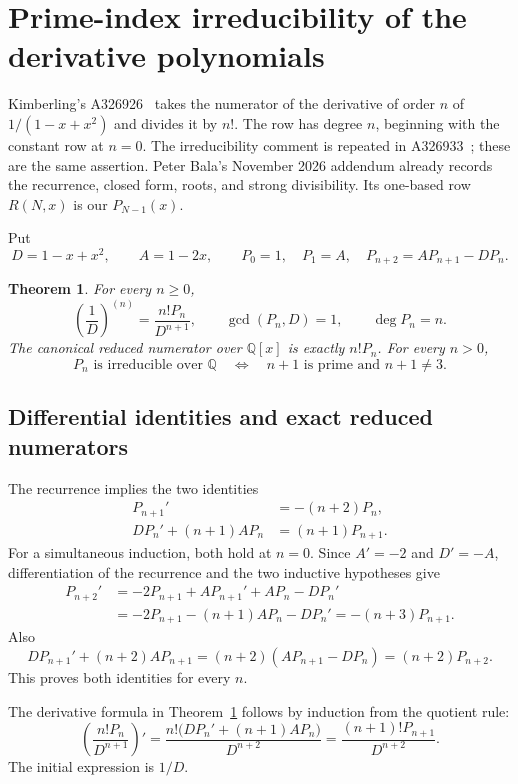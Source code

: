 \documentclass[11pt]{article}
\newtheorem{theorem}{Theorem}[section]
\newcommand{\Q}{\mathbb Q}
\begin{document}
\section{Prime-index irreducibility of the derivative polynomials}
\label{sec:polynomials}

Kimberling's A326926~\cite{A326926} takes the numerator of the
derivative of order $n$ of $1/(1-x+x^2)$ and divides it by $n!$.
The row has degree $n$, beginning with the constant row at $n=0$.
The irreducibility comment is repeated in A326933~\cite{A326933};
these are the same assertion. Peter Bala's November 2026 addendum
already records the recurrence, closed form, roots, and strong
divisibility. Its one-based row $R(N,x)$ is our $P_{N-1}(x)$.

Put
\[
D=1-x+x^2,\qquad A=1-2x,\qquad
P_0=1,\quad P_1=A,\quad P_{n+2}=AP_{n+1}-DP_n.
\]

\begin{theorem}\label{thm:polynomials}
For every $n\ge0$,
\[
\left(\frac1D\right)^{(n)}=\frac{n!P_n}{D^{n+1}},
\qquad \gcd(P_n,D)=1,\qquad \deg P_n=n.
\]
The canonical reduced numerator over $\Q[x]$ is exactly $n!P_n$.
For every $n>0$,
\[
P_n\text{ is irreducible over }\Q
\quad\Longleftrightarrow\quad n+1\text{ is prime and }n+1\ne3.
\]
\end{theorem}

\subsection{Differential identities and exact reduced numerators}

The recurrence implies the two identities
\begin{align}
P_{n+1}'&=-(n+2)P_n,\label{eq:appell}\\
DP_n'+(n+1)AP_n&=(n+1)P_{n+1}.\label{eq:differential}
\end{align}
For a simultaneous induction, both hold at $n=0$. Since $A'=-2$
and $D'=-A$, differentiation of the recurrence and the two
inductive hypotheses give
\[
\begin{aligned}
P_{n+2}'
 &=-2P_{n+1}+AP_{n+1}'+AP_n-DP_n'\\
 &=-2P_{n+1}-(n+1)AP_n-DP_n'
 =-(n+3)P_{n+1}.
\end{aligned}
\]
Also
\[
DP_{n+1}'+(n+2)AP_{n+1}
=(n+2)(AP_{n+1}-DP_n)=(n+2)P_{n+2}.
\]
This proves both identities for every $n$.

The derivative formula in Theorem~\ref{thm:polynomials} follows
by induction from the quotient rule:
\[
\left(\frac{n!P_n}{D^{n+1}}\right)'
=\frac{n!\bigl(DP_n'+(n+1)AP_n\bigr)}{D^{n+2}}
=\frac{(n+1)!P_{n+1}}{D^{n+2}}.
\]
The initial expression is $1/D$.
\end{document}
